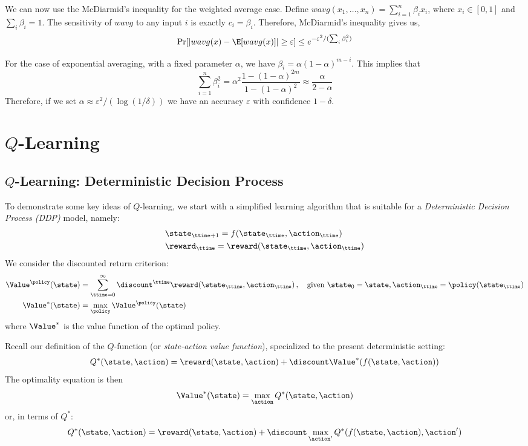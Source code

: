 We can now use the McDiarmid's inequality for the weighted average
case. Define $wavg(x_1, \ldots , x_n)=\sum_{i=1}^n \beta_i x_i$,
where $x_i\in[0,1]$ and $\sum_i \beta_i=1$. The sensitivity of
$wavg$ to any input $i$ is exactly $c_i=\beta_i$.
Therefore, McDiarmid's inequality gives us,
\[
\Pr[|wavg(x)-\E[wavg(x)]|\geq \varepsilon]\leq
e^{-\varepsilon^2/(\sum_i \beta_i^2)}
\]

For the case of exponential averaging, with a fixed parameter $\alpha$, we have $\beta_i=\alpha(1-\alpha)^{m-i}$. This implies
that
\[
\sum_{i=1}^n \beta_i^2 =
\alpha^2\frac{1-(1-\alpha)^{2m}}{1-(1-\alpha)^2}\approx
\frac{\alpha}{2-\alpha}
\]
Therefore, if we set $\alpha\approx \varepsilon^2/(\log (1/\delta))$
we have an accuracy $\varepsilon$ with confidence $1-\delta$.


\section{$Q$-Learning}
\subsection{ $Q$-Learning: Deterministic Decision Process}

To demonstrate some key ideas of $Q$-learning, we start with a
simplified learning algorithm that is suitable for a {\em
Deterministic Decision Process (DDP)} model, namely:
\begin{align*}
& \state_{\ttime+1}=f(\state_\ttime,\action_\ttime) \\
& \reward_\ttime=\reward(\state_\ttime,\action_\ttime)
\end{align*}
We consider the discounted return criterion:
\begin{align*}
\Value^{\policy}(\state) &=\sum_{\ttime=0}^\infty \discount^\ttime
\reward(\state_\ttime,\action_\ttime)\,,
\quad \text{given } \state_0=\state, \action_\ttime=\policy(\state_\ttime)\\
\Value^*(\state) &= \max_\policy \Value^\policy(\state)
\end{align*}
where $\Value^*$ is the value function of the optimal policy.

Recall our definition of the $Q$-function (or {\em state-action
value function}), specialized to the present deterministic setting:
$$
Q^*(\state,\action)=\reward(\state,\action)+\discount
\Value^*(f(\state,\action))
$$
The optimality equation is then
$$
\Value^*(\state) = \max_\action Q^*(\state,\action)
$$
or, in terms of $Q^*$:
$$
Q^*(\state,\action)=\reward(\state,\action)+\discount
\max_{\action'}Q^*(f(\state,\action),\action')
$$

